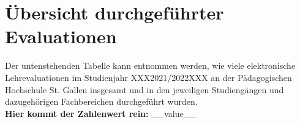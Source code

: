 \documentclass[11pt]{article}
\begin{document}
\begin{titlepage}


\end{titlepage}


\pagestyle{fancy}
	\fancyhf{}
	\renewcommand{\headrulewidth}{0pt}



\section{Übersicht durchgeführter Evaluationen}
Der untenstehenden Tabelle kann entnommen werden, wie viele elektronische Lehrevaluationen im Studienjahr XXX2021/2022XXX an der Pädagogischen Hochschule St. Gallen insgesamt und in den jeweiligen Studiengängen und dazugehörigen Fachbereichen durchgeführt wurden.\\

\noindent
\textbf{Hier kommt der Zahlenwert rein:} __value__
\end{document}
